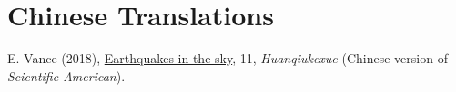 \section*{Chinese Translations}

\begin{etaremune}
\item
    E. Vance (2018), \href{https://huanqiukexue.com/a/zazhi/2018/2018/1130/28180.html}{Earthquakes in the sky}, 11,
    \textit{Huanqiukexue} (Chinese version of \textit{Scientific American}).
\end{etaremune}
